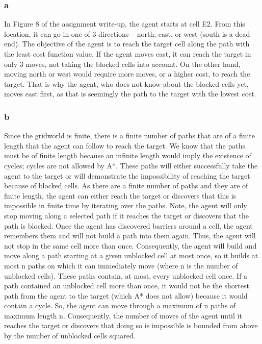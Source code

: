 \documentclass{article}
\begin{document}
\subsubsection*{a} In Figure 8 of the assignment write-up, the agent starts at cell E2. From this location, it can go in one of 3 directions – north, east, or west (south is a dead end). The objective of the agent is to reach the target cell along the path with the least cost function value. If the agent moves east, it can reach the target in only 3 moves, not taking the blocked cells into account. On the other hand, moving north or west would require more moves, or a higher cost, to reach the target. That is why the agent, who does not know about the blocked cells yet, moves east first, as that is seemingly the path to the target with the lowest cost.

\subsubsection*{b} Since the gridworld is finite, there is a finite number of paths that are of a finite length that the agent can follow to reach the target. We know that the paths must be of finite length because an infinite length would imply the existence of cycles; cycles are not allowed by A*. These paths will either successfully take the agent to the target or will demonstrate the impossibility of reaching the target because of blocked cells. As there are a finite number of paths and they are of finite length, the agent can either reach the target or discovers that this is impossible in finite time by iterating over the paths. Note, the agent will only stop moving along a selected path if it reaches the target or discovers that the path is blocked. Once the agent has discovered barriers around a cell, the agent remembers them and will not build a path into them again. Thus, the agent will not stop in the same cell more than once. Consequently, the agent will build and move along a path starting at a given unblocked cell at most once, so it builds at most n paths on which it can immediately move (where n is the number of unblocked cells). These paths contain, at most, every unblocked cell once. If a path contained an unblocked cell more than once, it would not be the shortest path from the agent to the target (which A* does not allow) because it would contain a cycle. So, the agent can move through a maximum of n paths of maximum length n. Consequently, the number of moves of the agent until it reaches the target or discovers that doing so is impossible is bounded from above by the number of unblocked cells squared.  
\end{document}

